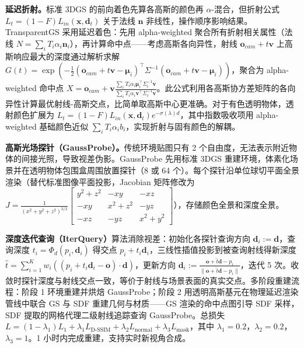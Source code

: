 \textbf{延迟折射。}标准 3DGS 的前向着色先算各高斯的颜色再 $\alpha$-混合，但折射公式 $L_t = (1-F)L_{in}(\mathbf{x},\mathbf{d}_t)$ 关于法线 $\mathbf{n}$ 非线性，操作顺序影响结果。TransparentGS 采用延迟着色：先用 alpha-weighted 聚合所有折射相关属性（法线 $N = \sum_i T_i \alpha_i \mathbf{n}_i$），再计算命中点——考虑高斯各向异性，射线 $\mathbf{o}_{cam}+t\mathbf{v}$ 上高斯响应最大的深度通过解析求解 $G(t) = \exp(-\frac{1}{2}(\mathbf{o}_{cam}+t\mathbf{v}-\boldsymbol{\mu}_i)^\top\Sigma^{-1}(\mathbf{o}_{cam}+t\mathbf{v}-\boldsymbol{\mu}_i))$，聚合为 alpha-weighted 命中点 $X = \mathbf{o}_{cam} + \mathbf{v}\frac{\sum_i T_i \alpha_i \boldsymbol{\mu}_i^{\top}\Sigma_i^{-1}\mathbf{v}}{\sum_i T_i \alpha_i \mathbf{v}^{\top}\Sigma_i^{-1}\mathbf{v}}$。此公式利用各高斯协方差矩阵的各向异性计算最优射线-高斯交点，比简单取高斯中心更准确。对于有色透明物体，透射颜色扩展为 $L_t = (1-F)L_{in}(\mathbf{x},\mathbf{d}_t) e^{-\sigma(\lambda) d}$，其中指数吸收项用 alpha-weighted 基础颜色近似 $\sum_i T_i \alpha_i b_i$，实现折射与固有颜色的解耦。

\textbf{高斯光场探针（GaussProbe）。}传统环境贴图只有 2 个自由度，无法表示附近物体的间接光照，导致视差伪影。GaussProbe 先用标准 3DGS 重建环境，体素化场景并在透明物体包围盒周围放置探针（8 或 64 个）。每个探针沿单位球切平面全景渲染（替代标准图像平面投影，Jacobian 矩阵修改为 $J = \frac{1}{(x^2+y^2+z^2)^{3/2}}\begin{bmatrix} y^2+z^2 & -xy & -xz \\ -xy & x^2+z^2 & -yz \\ -xz & -yz & x^2+y^2 \end{bmatrix}$），存储颜色全景和深度全景。

\textbf{深度迭代查询（IterQuery）}算法消除视差：初始化各探针查询方向 $\mathbf{d}_i := \mathbf{d}$，查询深度 $t_i = \Phi_d(p_i, \mathbf{d}_i)$ 得交点 $p_i + t_i\mathbf{d}_i$，三线性插值投影到被查询射线得新深度 $\hat{t} = \sum_{i=1}^K w_i((p_i + t_i\mathbf{d}_i - \mathbf{o})\cdot\mathbf{d})$，更新方向 $\mathbf{d}_i := \frac{\mathbf{o}+\hat{t}\mathbf{d}-p_i}{\|\mathbf{o}+\hat{t}\mathbf{d}-p_i\|}$，迭代 5 次。收敛时探针深度与射线交点一致，等价于射线与场景表面的真实交点。多阶段重建流程：阶段 1 环境重建并烘焙 GaussProbe；阶段 2 用透明高斯基元在物理延迟渲染管线中联合 GS 与 SDF 重建几何与材质——GS 渲染的命中点图引导 SDF 采样，SDF 提取的网格代理二级射线追踪查询 GaussProbe。总损失 $L = (1-\lambda_1)L_1 + \lambda_1 L_{\text{D-SSIM}} + \lambda_2 L_{\text{normal}} + \lambda_3 L_{\text{mask}}$，其中 $\lambda_1=0.2$，$\lambda_2=0.2$，$\lambda_3=1$。1 小时内完成重建，支持实时新视角合成。

